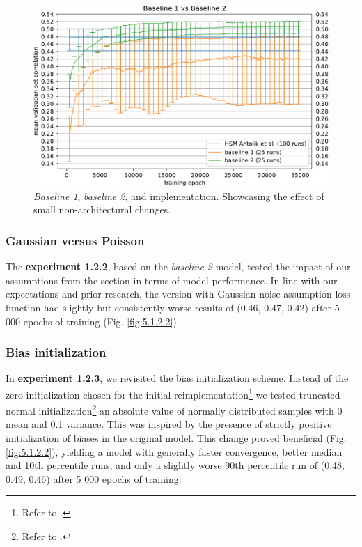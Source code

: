 \begin{figure}[H]
    \centering
    \includegraphics[width=1\textwidth]{../figures/05_1_2_1_2}
    \caption[Experiment 1.2.1 2]{\textit{Baseline 1}, \textit{baseline 2}, and \citeauthor{antolik} implementation. Showcasing the effect of small non-architectural changes.}
    \label{fig:5.1.2.1_2}
\end{figure}

\subsubsection{Gaussian versus Poisson}\label{ex:1.2.2}
The \textbf{experiment 1.2.2}, based on the \emph{baseline 2} model, tested the impact of our assumptions from the  section in terms of model performance. In line with our expectations and prior research, the version with Gaussian noise assumption loss function had slightly but consistently worse results of (0.46, 0.47, 0.42) after 5 000 epochs of training (Fig. \ref{fig:5.1.2.2}). 

\subsubsection{Bias initialization}\label{ex:1.2.3}

In \textbf{experiment 1.2.3}, we revisited the bias initialization scheme. Instead of the zero initialization chosen for the initial reimplementation\footnote{Refer to .} we tested truncated normal initialization\footnote{Refer to .} an absolute value of normally distributed samples with 0 mean and 0.1 variance. This was inspired by the presence of strictly positive initialization of biases in the original model. This change proved beneficial (Fig. \ref{fig:5.1.2.2}), yielding a model with generally faster convergence, better median and 10th percentile runs, and only a slightly worse 90th percentile run of (0.48, 0.49, 0.46) after 5 000 epochs of training.

